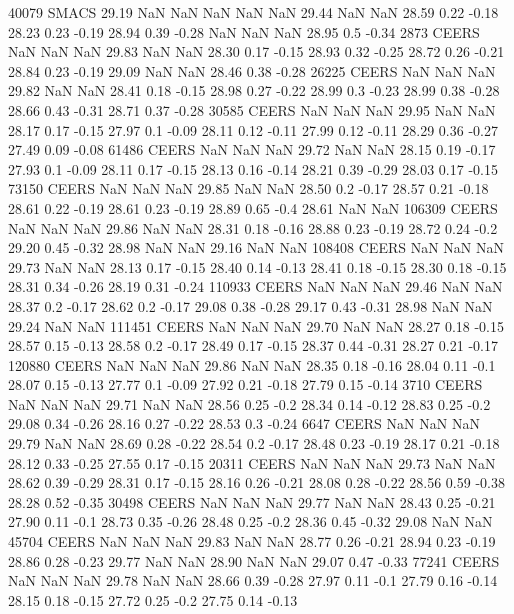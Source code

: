 		40079   SMACS   29.19 NaN NaN     NaN NaN NaN     29.44 NaN NaN    28.59 0.22 -0.18    28.23 0.23 -0.19    28.94 0.39 -0.28    NaN NaN NaN   28.95 0.5 -0.34
		2873   CEERS   NaN NaN NaN   29.83 NaN NaN   28.30 0.17 -0.15    28.93 0.32 -0.25    28.72 0.26 -0.21    28.84 0.23 -0.19    29.09 NaN NaN    28.46 0.38 -0.28
		26225   CEERS   NaN NaN NaN   29.82 NaN NaN   28.41 0.18 -0.15    28.98 0.27 -0.22    28.99 0.3 -0.23    28.99 0.38 -0.28    28.66 0.43 -0.31    28.71 0.37 -0.28
		30585   CEERS   NaN NaN NaN   29.95 NaN NaN   28.17 0.17 -0.15    27.97 0.1 -0.09    28.11 0.12 -0.11    27.99 0.12 -0.11    28.29 0.36 -0.27    27.49 0.09 -0.08
		61486   CEERS   NaN NaN NaN   29.72 NaN NaN   28.15 0.19 -0.17    27.93 0.1 -0.09    28.11 0.17 -0.15    28.13 0.16 -0.14    28.21 0.39 -0.29    28.03 0.17 -0.15
		73150   CEERS   NaN NaN NaN   29.85 NaN NaN   28.50 0.2 -0.17    28.57 0.21 -0.18    28.61 0.22 -0.19    28.61 0.23 -0.19    28.89 0.65 -0.4    28.61 NaN NaN
		106309   CEERS   NaN NaN NaN   29.86 NaN NaN    28.31 0.18 -0.16    28.88 0.23 -0.19    28.72 0.24 -0.2    29.20 0.45 -0.32    28.98 NaN NaN   29.16 NaN NaN
		108408   CEERS   NaN NaN NaN   29.73 NaN NaN   28.13 0.17 -0.15    28.40 0.14 -0.13    28.41 0.18 -0.15    28.30 0.18 -0.15    28.31 0.34 -0.26    28.19 0.31 -0.24
		110933   CEERS   NaN NaN NaN   29.46 NaN NaN   28.37 0.2 -0.17    28.62 0.2 -0.17    29.08 0.38 -0.28    29.17 0.43 -0.31    28.98 NaN NaN    29.24 NaN NaN
		111451   CEERS   NaN NaN NaN   29.70 NaN NaN   28.27 0.18 -0.15    28.57 0.15 -0.13    28.58 0.2 -0.17    28.49 0.17 -0.15    28.37 0.44 -0.31    28.27 0.21 -0.17
		120880   CEERS   NaN NaN NaN   29.86 NaN NaN   28.35 0.18 -0.16    28.04 0.11 -0.1    28.07 0.15 -0.13    27.77 0.1 -0.09    27.92 0.21 -0.18    27.79 0.15 -0.14
		3710   CEERS   NaN NaN NaN   29.71 NaN NaN   28.56 0.25 -0.2    28.34 0.14 -0.12    28.83 0.25 -0.2    29.08 0.34 -0.26    28.16 0.27 -0.22    28.53 0.3 -0.24
		6647   CEERS   NaN NaN NaN   29.79 NaN NaN   28.69 0.28 -0.22    28.54 0.2 -0.17    28.48 0.23 -0.19    28.17 0.21 -0.18    28.12 0.33 -0.25    27.55 0.17 -0.15
		20311   CEERS   NaN NaN NaN   29.73 NaN NaN   28.62 0.39 -0.29    28.31 0.17 -0.15    28.16 0.26 -0.21    28.08 0.28 -0.22    28.56 0.59 -0.38    28.28 0.52 -0.35
		30498   CEERS   NaN NaN NaN   29.77 NaN NaN   28.43 0.25 -0.21    27.90 0.11 -0.1    28.73 0.35 -0.26    28.48 0.25 -0.2    28.36 0.45 -0.32    29.08 NaN NaN
		45704   CEERS   NaN NaN NaN   29.83 NaN NaN    28.77 0.26 -0.21    28.94 0.23 -0.19    28.86 0.28 -0.23    29.77 NaN NaN    28.90 NaN NaN   29.07 0.47 -0.33
		77241   CEERS   NaN NaN NaN   29.78 NaN NaN   28.66 0.39 -0.28    27.97 0.11 -0.1    27.79 0.16 -0.14    28.15 0.18 -0.15    27.72 0.25 -0.2    27.75 0.14 -0.13
